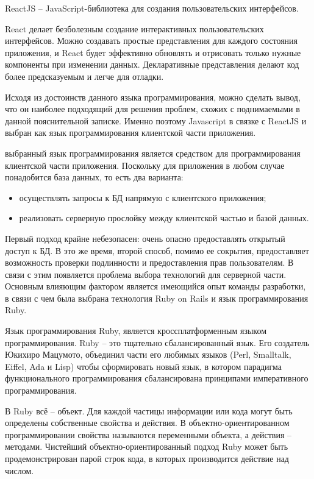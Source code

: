 ReactJS -- JavaScript-библиотека для создания пользовательских интерфейсов.

React делает безболезным создание интерактивных пользовательских интерфейсов. Можно создавать простые представления для
каждого состояния приложения, и React будет эффективно обновлять и отрисовать только нужные компоненты при изменении данных.
Декларативные представления делают код более предсказуемым и легче для отладки.

Исходя из достоинств данного языка программирования, можно сделать вывод, что он наиболее подходящий для решения
проблем, схожих с поднимаемыми в данной пояснительной записке. Именно поэтому Javascript в связке с ReactJS и выбран
как язык программирования клиентской части приложения.

выбранный язык программирования является средством для программирования клиентской части приложения.
Поскольку для приложения в любом случае понадобится база данных, то есть два варианта:

\begin{itemize}
	\item осуществлять запросы к БД напрямую с клиентского приложения;
	\item реализовать серверную прослойку между клиентской частью и базой данных.
\end{itemize}

Первый подход крайне небезопасен: очень опасно предоставлять открытый доступ к БД. В это же время, второй способ,
помимо ее сокрытия, предоставляет возможность проверки подлинности и предоставления прав пользователям.
В связи с этим появляется проблема выбора технологий для серверной части. Основным влияющим фактором является
имеющийся опыт команды разработки, в связи с чем была выбрана технология Ruby on Rails и язык программирования Ruby.

Язык программирования Ruby, является кроссплатформенным языком программирования. Ruby -- это тщательно сбалансированный
язык. Его создатель Юкихиро Мацумото, объединил части его любимых языков (Perl, \linebreak Smalltalk, Eiffel, Ada и Lisp) чтобы
сформировать новый язык, в котором парадигма функционального программирования сбалансирована принципами
императивного программирования. 

В Ruby всё -- объект. Для каждой частицы информации или кода могут быть определены собственные свойства и действия.
В объектно-ориентирован\-ном программировании свойства называются переменными объекта, а действия – методами.
Чистейший объектно-ориентированный подход Ruby может быть продемонстрирован парой строк кода, в которых производится
действие над числом.

